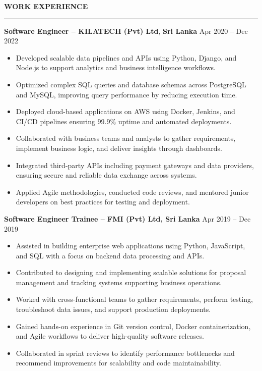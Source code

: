 \documentclass[10pt,letterpaper]{article}
\begin{document}
\vspace{8pt}

\textbf{WORK EXPERIENCE}\\[-8pt]
\noindent\rule{\textwidth}{1pt}

\vspace{-2pt}

\textbf{Software Engineer -- KILATECH (Pvt) Ltd}, \textbf{Sri Lanka} \hfill Apr 2020 -- Dec 2022

\vspace{-1pt}

\begin{itemize}
\item Developed scalable data pipelines and APIs using Python, Django, and Node.js to support analytics and business intelligence workflows.
\item Optimized complex SQL queries and database schemas across PostgreSQL and MySQL, improving query performance by reducing execution time.
\item Deployed cloud-based applications on AWS using Docker, Jenkins, and CI/CD pipelines ensuring 99.9\% uptime and automated deployments.
\item Collaborated with business teams and analysts to gather requirements, implement business logic, and deliver insights through dashboards.
\item Integrated third-party APIs including payment gateways and data providers, ensuring secure and reliable data exchange across systems.
\item Applied Agile methodologies, conducted code reviews, and mentored junior developers on best practices for testing and deployment.
\end{itemize}

\textbf{Software Engineer Trainee -- FMI (Pvt) Ltd, Sri Lanka} \hfill Apr 2019 -- Dec 2019

\vspace{-1pt}

\begin{itemize}
\item Assisted in building enterprise web applications using Python, JavaScript, and SQL with a focus on backend data processing and APIs.
\item Contributed to designing and implementing scalable solutions for proposal management and tracking systems supporting business operations.
\item Worked with cross-functional teams to gather requirements, perform testing, troubleshoot data issues, and support production deployments.
\item Gained hands-on experience in Git version control, Docker containerization, and Agile workflows to deliver high-quality software releases.
\item Collaborated in sprint reviews to identify performance bottlenecks and recommend improvements for scalability and code maintainability.
\end{itemize}
\end{document}
